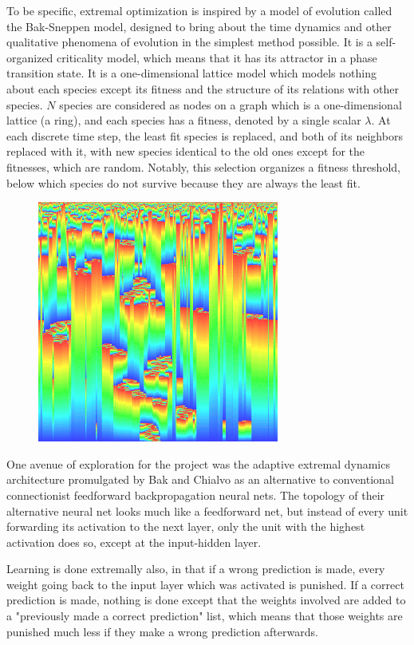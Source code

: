 \documentclass[12pt]{article}
\begin{document}
To be specific, extremal optimization is inspired by a model of evolution called the Bak-Sneppen model, designed to bring about the time dynamics and other qualitative phenomena of evolution in the simplest method possible. It is a self-organized criticality model, which means that it has its attractor in a phase transition state. It is a one-dimensional lattice model which models nothing about each species except its fitness and the structure of its relations with other species. $N$ species are considered as nodes on a graph which is a one-dimensional lattice (a ring), and each species has a fitness, denoted by a single scalar $\lambda$. At each discrete time step, the least fit species is replaced, and both of its neighbors replaced with it, with new species identical to the old ones except for the fitnesses, which are random. Notably, this selection organizes a fitness threshold, below which species do not survive because they are always the least fit.

\begin{figure}
  \includegraphics{bak_sneppen}
\end{figure}

One avenue of exploration for the project was the adaptive extremal dynamics architecture promulgated by Bak and Chialvo as an alternative to conventional connectionist feedforward backpropagation neural nets. The topology of their alternative neural net looks much like a feedforward net, but instead of every unit forwarding its activation to the next layer, only the unit with the highest activation does so, except at the input-hidden layer.

Learning is done extremally also, in that if a wrong prediction is made, every weight going back to the input layer which was activated is punished. If a correct prediction is made, nothing is done except that the weights involved are added to a "previously made a correct prediction" list, which means that those weights are punished much less if they make a wrong prediction afterwards.
\end{document}
